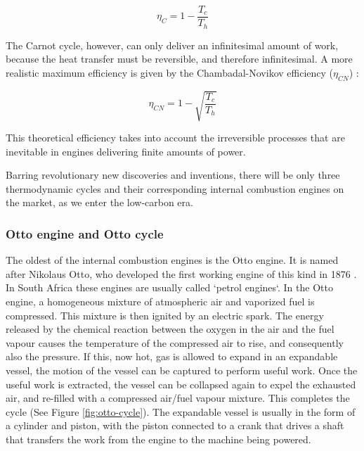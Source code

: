 \[
	\eta_{C} = 1 - \frac{T_c}{T_h}
\]

The Carnot cycle, however, can only deliver an infinitesimal amount of work,
because the heat transfer must be reversible, and therefore infinitesimal. A
more realistic maximum efficiency is given by the Chambadal-Novikov efficiency
(\(\eta_{CN}\)) \autocite{Hoffmann2008}:

\[
	\eta_{CN} = 1 - \sqrt{\frac{T_c}{T_h}}
\]

This theoretical efficiency takes into account the irreversible processes that
are inevitable in engines delivering finite amounts of power.

Barring revolutionary new discoveries and inventions, there will be only three
thermodynamic cycles and their corresponding internal combustion engines on the
market, as we enter the low-carbon era.

\subsubsection{Otto engine and Otto cycle}

The oldest of the internal combustion engines is the Otto engine. It is named
after Nikolaus Otto, who developed the first working engine of this kind in 1876
\autocite[Chapter 9]{Cummins1989}. In South Africa these engines are usually
called `petrol engines`. In the Otto engine, a homogeneous mixture of
atmospheric air and vaporized fuel is compressed. This mixture is then ignited
by an electric spark. The energy released by the chemical reaction between the
oxygen in the air and the fuel vapour causes the temperature of the compressed
air to rise, and consequently also the pressure. If this, now hot, gas is
allowed to expand in an expandable vessel, the motion of the vessel can be
captured to perform useful work. Once the useful work is extracted, the vessel
can be collapsed again to expel the exhausted air, and re-filled with a
compressed air/fuel vapour mixture. This completes the cycle (See Figure
\ref{fig:otto-cycle}). The expandable vessel is usually in the form of a
cylinder and piston, with the piston connected to a crank that drives a shaft
that transfers the work from the engine to the machine being powered.

